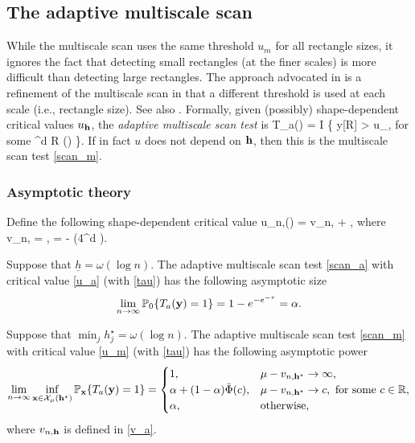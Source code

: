\documentclass[twoside,11pt]{article}
\begin{document}
\subsection{The adaptive multiscale scan}

While the multiscale scan uses the same threshold $u_m$ for all rectangle sizes, it ignores the fact that detecting small rectangles (at the finer scales) is more difficult than detecting large rectangles.
The approach advocated in \citep{MR2604703,cluster} is a refinement of the multiscale scan in that a different threshold is used at each scale (i.e., rectangle size).
See also \citep{glaz2004multiple,wang2014variable}.
Formally, given (possibly) shape-dependent critical values $u_{\mathbf{h}}$, the {\em adaptive multiscale scan test} is  
\beq \label{scan_a}
T_a(\yb) = I \big\{ y[R] > u_\hb, \textrm{ for some } \hb {}^d  R \in \Rcal(\hb) \big\}.
\eeq
If in fact $u$ does not depend on $\mathbf{h}$, then this is the multiscale scan test \eqref{scan_m}.


\subsubsection{Asymptotic theory}
Define the following shape-dependent critical value 
\beq \label{u_a}
u_{n,\hb}(\tau) = v_{n,\hb} + ,
\eeq
where 
\beq \label{v_a}
v_{n,\hb} = , \quad \kappa = - \log (4^d \sqrt {2 \pi}).
\eeq

\begin{theorem}
\label{thm:adaptive_type1}
Suppose that $\underline h = \omega(\log n)$.
The adaptive multiscale scan test \eqref{scan_a} with critical value \eqref{u_a} (with \eqref{tau}) has the following asymptotic size 
\[ 
\lim_{n \rightarrow \infty} \mathbb{P}_0 \{T_a(\mathbf{y}) = 1\} = 1 - e^{-e^{-\tau}} = \alpha.
\]
\end{theorem}


\begin{theorem}
\label{thm:adaptive_type2}
Suppose that $\min_j h_j^\star = \omega(\log n)$. 
The adaptive multiscale scan test \eqref{scan_m} with critical value \eqref{u_m} (with \eqref{tau}) has the following asymptotic power 
\[
\lim_{n \rightarrow \infty} \inf_{\mathbf{x} \in \mathcal{X}_\mu(\mathbf{h}^\star)} \mathbb{P}_{\mathbf{x}} \{ T_a(\mathbf{y}) = 1 \} = 
\begin{cases}
1, &\mu - v_{n,\mathbf{h}^\star} \rightarrow \infty,\\
\alpha + (1 - \alpha) \bar\Phi(c), &\mu - v_{n,\mathbf{h}^\star} \rightarrow c, \textrm{ for some } c \in \mathbb{R},\\
\alpha, &\textrm{otherwise},
\end{cases}\]
where $v_{n,\mathbf{h}}$ is defined in \eqref{v_a}.
\end{theorem}
\end{document}
